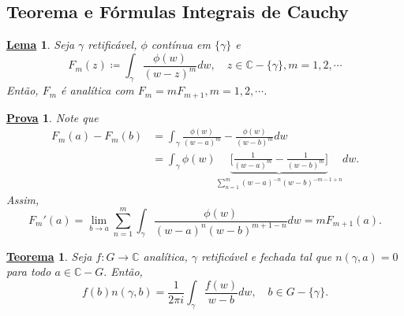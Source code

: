 \documentclass{article}
\newtheorem*{theorem*}{\underline{Teorema}}
\newtheorem*{proof*}{\underline{Prova}}
\newtheorem*{lmm*}{\underline{Lema}}
\begin{document}
  \subsection{Teorema e F\'ormulas Integrais de Cauchy}
  \begin{lmm*}
    Seja $\gamma$ retific\'avel, $\phi$ cont\'inua em $\{\gamma\} $ e 
    $$
    F_{m}(z)\coloneqq  \int_{\gamma}^{}\frac{\phi(w)}{(w-z)^{m}}dw, \quad z\in \mathbb{C}-\{\gamma\}, m=1, 2, \cdots
    $$
    Ent\~ao, $F_{m}$ \'e anal\'itica com $F_{m} = mF_{m+1}, m = 1, 2, \cdots$.
  \end{lmm*}
  \begin{proof*}
    Note que 
    \begin{align*}
      F_{m}(a) - F_{m}(b) &= \int_{\gamma}^{}\frac{\phi(w)}{(w-a)^{m}} - \frac{\phi(w)}{(w-b)^{m}}dw \\
                          &= \int_{\gamma}^{}\phi(w)\underbrace{\biggl[\frac{1}{(w-a)^{m}} - \frac{1}{(w-b)^{m}}\biggr]}_{\sum\limits_{n=1}^{m}(w-a)^{-n}(w-b)^{-m-1+n}}dw.
    \end{align*}
    Assim,
    $$
    F_{m}'(a) = \lim_{b\to{a}}\sum\limits_{n=1}^{m}\int_{\gamma}^{}\frac{\phi(w)}{(w-a)^{n}(w-b)^{m+1-n}}dw = mF_{m+1}(a).
    $$
  \end{proof*}
  \begin{theorem*}
    Seja $f:G\rightarrow \mathbb{C}$ anal\'itica, $\gamma$ retific\'avel e fechada tal que $n(\gamma, a) = 0$ para todo $a\in \mathbb{C}-G.$
    Ent\~ao, 
    $$
    f(b)n(\gamma, b) = \frac{1}{2\pi i}\int_{\gamma}^{}\frac{f(w)}{w-b}dw, \quad b\in{G-\{\gamma\}}.
    $$
  \end{theorem*}
\end{document}
